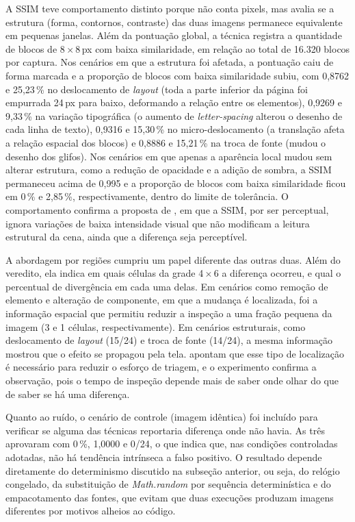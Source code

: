 \documentclass{UNESC}
\begin{document}
A SSIM teve comportamento distinto porque não conta pixels, mas avalia se a estrutura (forma, contornos, contraste) das duas imagens permanece equivalente em pequenas janelas. Além da pontuação global, a técnica registra a quantidade de blocos de 8\,$\times$\,8\,px com baixa similaridade, em relação ao total de 16.320 blocos por captura. Nos cenários em que a estrutura foi afetada, a pontuação caiu de forma marcada e a proporção de blocos com baixa similaridade subiu, com 0,8762 e 25,23\,\% no deslocamento de \emph{layout} (toda a parte inferior da página foi empurrada 24\,px para baixo, deformando a relação entre os elementos), 0,9269 e 9,33\,\% na variação tipográfica (o aumento de \emph{letter-spacing} alterou o desenho de cada linha de texto), 0,9316 e 15,30\,\% no micro-deslocamento (a translação afeta a relação espacial dos blocos) e 0,8886 e 15,21\,\% na troca de fonte (mudou o desenho dos glifos). Nos cenários em que apenas a aparência local mudou sem alterar estrutura, como a redução de opacidade e a adição de sombra, a SSIM permaneceu acima de 0,995 e a proporção de blocos com baixa similaridade ficou em 0\,\% e 2,85\,\%, respectivamente, dentro do limite de tolerância. O comportamento confirma a proposta de , em que a SSIM, por ser perceptual, ignora variações de baixa intensidade visual que não modificam a leitura estrutural da cena, ainda que a diferença seja perceptível.

A abordagem por regiões cumpriu um papel diferente das outras duas. Além do veredito, ela indica em quais células da grade 4\,$\times$\,6 a diferença ocorreu, e qual o percentual de divergência em cada uma delas. Em cenários como remoção de elemento e alteração de componente, em que a mudança é localizada, foi a informação espacial que permitiu reduzir a inspeção a uma fração pequena da imagem (3 e 1 células, respectivamente). Em cenários estruturais, como deslocamento de \emph{layout} (15/24) e troca de fonte (14/24), a mesma informação mostrou que o efeito se propagou pela tela.  apontam que esse tipo de localização é necessário para reduzir o esforço de triagem, e o experimento confirma a observação, pois o tempo de inspeção depende mais de saber onde olhar do que de saber se há uma diferença.

Quanto ao ruído, o cenário de controle (imagem idêntica) foi incluído para verificar se alguma das técnicas reportaria diferença onde não havia. As três aprovaram com 0\,\%, 1,0000 e 0/24, o que indica que, nas condições controladas adotadas, não há tendência intrínseca a falso positivo. O resultado depende diretamente do determinismo discutido na subseção anterior, ou seja, do relógio congelado, da substituição de \emph{Math.random} por sequência determinística e do empacotamento das fontes, que evitam que duas execuções produzam imagens diferentes por motivos alheios ao código.
\end{document}

